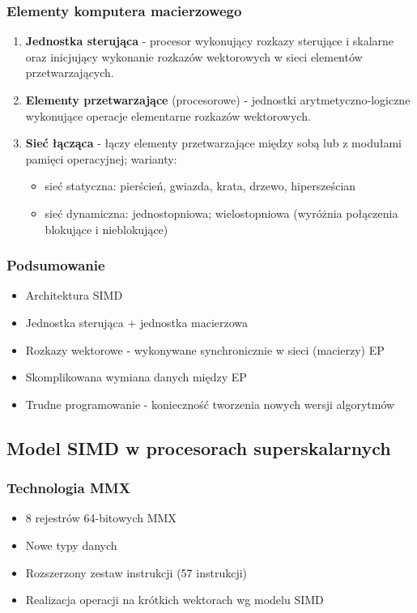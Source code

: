 		\subsubsection{Elementy komputera macierzowego}
			\begin{enumerate}
				\item \textbf{Jednostka sterująca} - procesor wykonujący rozkazy sterujące i skalarne oraz inicjujący wykonanie rozkazów wektorowych w sieci elementów przetwarzających.
				\item \textbf{Elementy przetwarzające} (procesorowe) - jednostki arytmetyczno-logiczne wykonujące operacje elementarne rozkazów wektorowych.
				\item \textbf{Sieć łącząca} - łączy elementy przetwarzające między sobą lub z modułami pamięci operacyjnej; warianty:
				\begin{itemize}
					\item sieć statyczna: pierścień, gwiazda, krata, drzewo, hipersześcian
					\item sieć dynamiczna: jednostopniowa; wielostopniowa (wyróżnia połączenia blokujące i nieblokujące)
				\end{itemize}
			\end{enumerate}
		
		\subsubsection{Podsumowanie}
			\begin{itemize}
				\item Architektura SIMD
				\item Jednostka sterująca + jednostka macierzowa
				\item Rozkazy wektorowe - wykonywane synchronicznie w sieci (macierzy) EP
				\item Skomplikowana wymiana danych między EP
				\item Trudne programowanie - konieczność tworzenia nowych wersji algorytmów
			\end{itemize}
	
	\subsection{Model SIMD w procesorach superskalarnych}
		\subsubsection{Technologia MMX}
			\begin{itemize}
				\item 8 rejestrów 64-bitowych MMX
				\item Nowe typy danych
				\item Rozszerzony zestaw instrukcji (57 instrukcji)
				\item Realizacja operacji na krótkich wektorach wg modelu SIMD
			\end{itemize}
